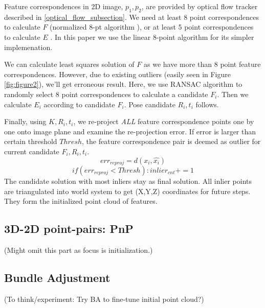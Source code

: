 \documentclass[10pt,twocolumn,letterpaper]{article}
\begin{document}
Feature correspondences in 2D image, $p_1, p_2$, are provided by optical flow tracker described in \ref{optical_flow_subsection}. We need at least 8 point correspondences to calculate $F$ (normalized 8-pt algorithm \cite{Hartley2004}), or at least 5 point correspondences to calculate $E$ \cite{Nister:2004:ESF:987526.987623}. In this paper we use the linear 8-point algorithm for its simpler implemenation.

We can calculate least squares solution of $F$ as we have more than 8 point feature  correspondences. However, due to existing outliers (easily seen in Figure \ref{fig:figure2}), we'll get erroneous result. Here, we use RANSAC \cite{Fischler:1981:RSC:358669.358692} algorithm to randomly select 8 point correspondences to calculate a candidate $F_i$. Then we calculate $E_i$ according to candidate $F_i$. Pose candidate $R_i, t_i$ follows. 

Finally, using $K, R_i, t_i$, we re-project \emph{ALL} feature correspondence points one by one onto image plane and examine the re-projection error. If error is larger than certain threshold $Thresh$, the feature correspondence pair is deemed as outlier for current candidate $F_i, R_i, t_i$. 
\begin{equation} \label{eq:3}
{err}_{reproj} = d(x_i, \hat{x_i})
\end{equation}
\begin{equation} \label{eq:3}
if ({err}_{reproj} < Thresh):
    {inlier}_{cnt} += 1
\end{equation}
The candidate solution with most inliers stay as final solution. All inlier points are triangulated into world system to get (X,Y,Z) coordinates for future steps. They form the initialized point cloud of features. 


\subsection{3D-2D point-pairs: PnP}

(Might omit this part as focus is initialization.)

\subsection{Bundle Adjustment}

(To think/experiment: Try BA to fine-tune initial point cloud?)
\end{document}

